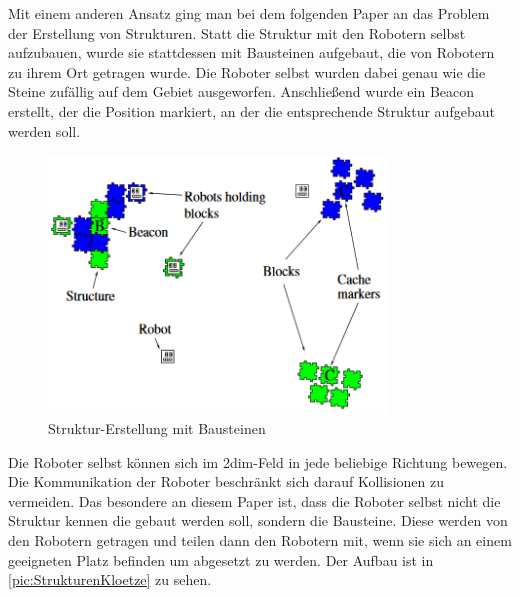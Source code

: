 Mit einem anderen Ansatz ging man bei dem folgenden Paper an das Problem der Erstellung von Strukturen. Statt die Struktur mit den Robotern selbst aufzubauen, wurde sie stattdessen mit Bausteinen aufgebaut, die von Robotern zu ihrem Ort getragen wurde. Die Roboter selbst wurden dabei genau wie die Steine zufällig auf dem Gebiet ausgeworfen. Anschließend wurde ein Beacon erstellt, der die Position markiert, an der die entsprechende Struktur aufgebaut werden soll.

\begin{figure}[h]
	\centering
	\includegraphics[width=0.8\textwidth,keepaspectratio]{graphics/StrukturenKloetze.png}
	\caption{Struktur-Erstellung mit Bausteinen}
	\label{pic:StrukturenKloetze}
\end{figure}

Die Roboter selbst können sich im 2dim-Feld in jede beliebige Richtung bewegen. Die Kommunikation der Roboter beschränkt sich darauf Kollisionen zu vermeiden. Das besondere an diesem Paper ist, dass die Roboter selbst nicht die Struktur kennen die gebaut werden soll, sondern die Bausteine. Diese werden von den Robotern getragen und teilen dann den Robotern mit, wenn sie sich an einem geeigneten Platz befinden um abgesetzt zu werden.\cite{RobotPatterns}
Der Aufbau ist in \autoref{pic:StrukturenKloetze} zu sehen.
